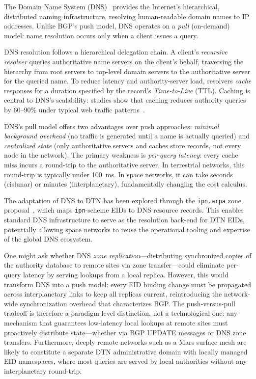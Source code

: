 \documentclass[journal,twocolumn]{IEEEtran}
\begin{document}
The Domain Name System (DNS)~\cite{rfc1035} provides the Internet's hierarchical, distributed naming infrastructure, resolving human-readable domain names to IP addresses. Unlike BGP's push model, DNS operates on a \emph{pull} (on-demand) model: name resolution occurs only when a client issues a query.

DNS resolution follows a hierarchical delegation chain. A client's \emph{recursive resolver} queries authoritative name servers on the client's behalf, traversing the hierarchy from root servers to top-level domain servers to the authoritative server for the queried name. To reduce latency and authority-server load, resolvers \emph{cache} responses for a duration specified by the record's \emph{Time-to-Live} (TTL). Caching is central to DNS's scalability: studies show that caching reduces authority queries by 60--90\% under typical web traffic patterns~\cite{jung2002dns, breslau1999web}.

DNS's pull model offers two advantages over push approaches: \emph{minimal background overhead} (no traffic is generated until a name is actually queried) and \emph{centralized state} (only authoritative servers and caches store records, not every node in the network). The primary weakness is \emph{per-query latency}: every cache miss incurs a round-trip to the authoritative server. In terrestrial networks, this round-trip is typically under 100~ms. In space networks, it can take seconds (cislunar) or minutes (interplanetary), fundamentally changing the cost calculus.

The adaptation of DNS to DTN has been explored through the \texttt{ipn.arpa} zone proposal~\cite{kline2025ipnarpa}, which maps \texttt{ipn}-scheme EIDs to DNS resource records. This enables standard DNS infrastructure to serve as the resolution back-end for DTN EIDs, potentially allowing space networks to reuse the operational tooling and expertise of the global DNS ecosystem.

One might ask whether DNS \emph{zone replication}---distributing synchronized copies of the authority database to remote sites via zone transfer---could eliminate per-query latency by serving lookups from a local replica.
However, this would transform DNS into a push model: every EID binding change must be propagated across interplanetary links to keep all replicas current, reintroducing the network-wide synchronization overhead that characterizes BGP.
The push-versus-pull tradeoff is therefore a paradigm-level distinction, not a technological one: any mechanism that guarantees low-latency local lookups at remote sites must proactively distribute state---whether via BGP UPDATE messages or DNS zone transfers.
Furthermore, deeply remote networks such as a Mars surface mesh are likely to constitute a separate DTN administrative domain with locally managed EID namespaces, where most queries are served by local authorities without any interplanetary round-trip.
\end{document}
